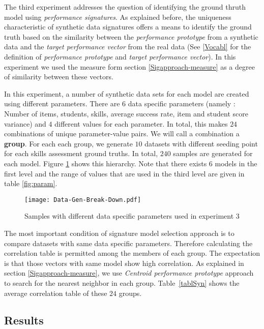 The third experiment addresses the question of identifying the ground thruth model using \textit{performance signatures}. As explained before, the uniqueness characteristic of synthetic data signatures offers a means to identify the ground truth based on the similarity between the \textit{performance prototype} from a synthetic data and the \textit{target performance vector} from the real data (See \ref{Vocabl} for the definition of \textit{performance prototype} and \textit{target performance vector}). In this experiment we used the measure form section \ref{Sigapproach-measure} as a degree of similarity between these vectors.

In this experiment, a number of synthetic data sets for each model are created using different parameters. There are $6$ data specific parameters (namely : Number of items, students, skills, average success rate, item and student score variance) and $4$ different values for each parameter.  In total, this makes $24$ combinations of unique parameter-value pairs.  We will call a combination a \textbf{group}. For each each group, we generate $10$ datasets with different seeding point for each skills assessment ground truths. In total, $240$ samples are generated for each model. Figure \ref{figData-Gen-Break-Down} shows this hierarchy. Note that there exists 6 models in the first level and the range of values that are used in the third level are given in table \ref{fig:param}.

 \begin{figure}[h]
  \centering
    \texttt{[image: Data-Gen-Break-Down.pdf]}
\caption{Samples with different data specific parameters used in experiment 3}
\label{figData-Gen-Break-Down}
\end{figure}


The most important condition of signature model selection approach is to compare datasets with same data specific parameters. Therefore calculating the correlation table is permitted among the members of each group. The expectation is that those vectors with same model show high correlation. As explained in section \ref{Sigapproach-measure}, we use \textit{Centroid performance prototype} approach to search for the nearest neighbor in each group. Table~\ref{tablSyn} shows the average correlation table of these $24$ groups.

\subsection{Results}

